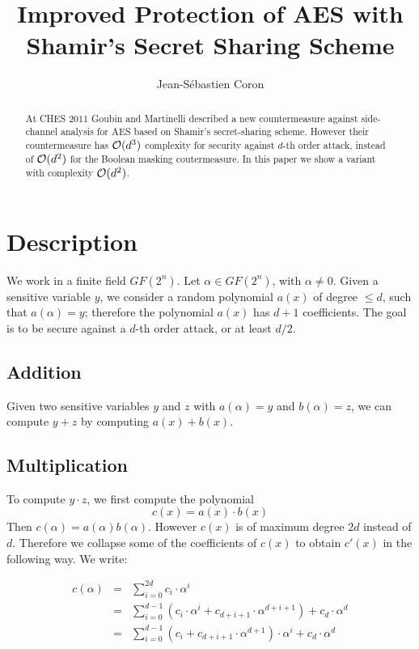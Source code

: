 \documentclass[11pt]{article}
\begin{document}
\title{Improved Protection of AES with Shamir's Secret Sharing Scheme}

\author{
Jean-S\'ebastien Coron}

\maketitle

\begin{abstract}
At CHES 2011 Goubin and Martinelli described a new countermeasure
against side-channel analysis for AES based on Shamir's secret-sharing
scheme. However their countermeasure has ${\cal O}(d^3)$ complexity
for security against $d$-th order attack, instead of ${\cal O}(d^2)$
for the Boolean masking coutermeasure.
In this paper we show a variant
with complexity ${\cal O}(d^2)$.
\end{abstract}

\section{Description}

We work in a finite field $GF(2^n)$. Let $\alpha \in GF(2^n)$, with
$\alpha \neq 0$. Given
a sensitive variable $y$, 
we consider a random
polynomial $a(x)$ of degree $\leq d$, such that $a(\alpha)=y$;
therefore the polynomial $a(x)$ has $d+1$ coefficients. The goal is to
be secure against a $d$-th order attack, or at least $d/2$.

\subsection{Addition}

Given two sensitive variables $y$ and $z$ with $a(\alpha)=y$ and
$b(\alpha)=z$, we can compute $y+z$ by computing $a(x)+b(x)$. 

\subsection{Multiplication}

To compute $y \cdot z$, we first compute the polynomial 
$$c(x)=a(x) \cdot b(x)$$
Then $c(\alpha)=a(\alpha)b(\alpha)$. However $c(x)$ is of maximum
degree $2d$ instead of $d$. Therefore we collapse some of the
coefficients of $c(x)$ to obtain $c'(x)$ in the following way. We
write:

\begin{eqnarray*}
 c(\alpha) & = & \sum\limits_{i=0}^{2d} c_i \cdot \alpha^{i}\\
& = & \sum\limits_{i=0}^{d-1} \left(c_i \cdot \alpha^i + c_{d+i+1} \cdot
 \alpha^{d+i+1}\right) + c_d \cdot \alpha^d\\
& = & \sum\limits_{i=0}^{d-1} \left(c_i + c_{d+i+1} \cdot \alpha^{d+1}
 \right) \cdot \alpha^i + c_d \cdot \alpha^d
\end{eqnarray*}
\end{document}
